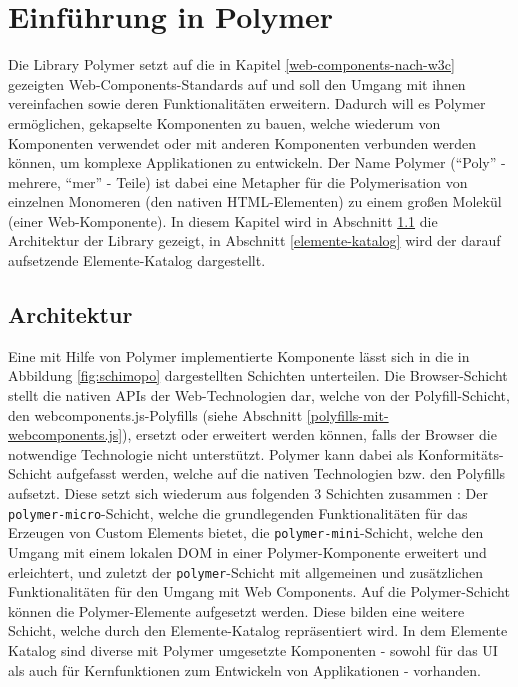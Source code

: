 \chapter{Einführung in Polymer}\label{einfuehrung-in-polymer}

Die Library Polymer setzt auf die in Kapitel \ref{web-components-nach-w3c} gezeigten Web-Components-Standards auf und soll den Umgang mit ihnen vereinfachen sowie deren Funktionalitäten erweitern. Dadurch will es Polymer ermöglichen, gekapselte Komponenten zu bauen, welche wiederum von Komponenten verwendet oder mit anderen Komponenten verbunden werden können, um komplexe Applikationen zu entwickeln. Der Name Polymer (``Poly'' - mehrere, ``mer'' - Teile) ist dabei eine Metapher für die Polymerisation von einzelnen Monomeren (den nativen \ac{HTML}-Elementen) zu einem großen Molekül (einer Web-Komponente). In diesem Kapitel wird in Abschnitt \ref{architektur} die Architektur der Library gezeigt, in Abschnitt \ref{elemente-katalog} wird der darauf aufsetzende Elemente-Katalog dargestellt.


\section{Architektur}\label{architektur}

Eine mit Hilfe von Polymer implementierte Komponente lässt sich in die in Abbildung \ref{fig:schimopo} dargestellten Schichten unterteilen. Die Browser-Schicht stellt die nativen \ac{API}s der Web-Technologien dar, welche von der Polyfill-Schicht, den webcomponents.js-Polyfills (siehe Abschnitt \ref{polyfills-mit-webcomponents.js}), ersetzt oder erweitert werden können, falls der Browser die notwendige Technologie nicht unterstützt. Polymer kann dabei als Konformitäts-Schicht aufgefasst werden, welche auf die nativen Technologien bzw. den Polyfills aufsetzt. Diese setzt sich wiederum aus folgenden 3 Schichten zusammen \cite{citeulike:13915080}: Der \texttt{polymer-micro}-Schicht, welche die grundlegenden Funktionalitäten für das Erzeugen von Custom Elements bietet, die \texttt{polymer-mini}-Schicht, welche den Umgang mit einem lokalen \ac{DOM} in einer Polymer-Komponente erweitert und erleichtert, und zuletzt der \texttt{polymer}-Schicht mit allgemeinen und zusätzlichen Funktionalitäten für den Umgang mit Web Components. Auf die Polymer-Schicht können die Polymer-Elemente aufgesetzt werden. Diese bilden eine weitere Schicht, welche durch den Elemente-Katalog \cite{citeulike:13916374} repräsentiert wird. In dem Elemente Katalog sind diverse mit Polymer umgesetzte Komponenten - sowohl für das \ac{UI} als auch für Kernfunktionen zum Entwickeln von Applikationen - vorhanden.


